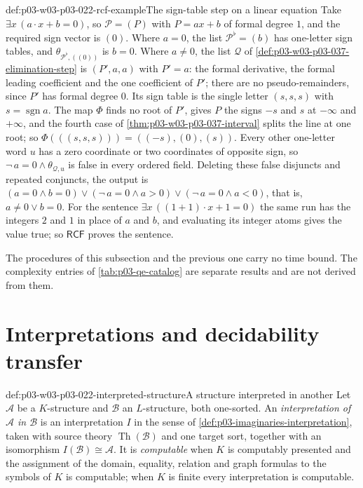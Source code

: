 \begin{hbexample}{def:p03-w03-p03-022-rcf-example}{The sign-table step on a linear equation}
Take \(\exists x\,(a\cdot x+b=0)\), so \(\mathcal P=(P)\) with
\(P=ax+b\) of formal degree \(1\), and the required sign vector is \((0)\).
Where \(a=0\), the list \(\mathcal P^\flat=(b)\) has one-letter sign tables,
and \(\theta_{\mathcal P^\flat,((0))}\) is \(b=0\). Where \(a\ne0\), the list
\(\mathcal Q\) of \cref{def:p03-w03-p03-037-elimination-step} is
\((P',a,a)\) with \(P'=a\): the formal derivative, the formal leading
coefficient and the one coefficient of \(P'\); there are no
pseudo-remainders, since \(P'\) has formal degree \(0\). Its sign table is
the single letter \((s,s,s)\) with \(s=\operatorname{sgn}a\). The map
\(\Phi\) finds no root of \(P'\), gives \(P\) the signs \(-s\) and \(s\) at
\(-\infty\) and \(+\infty\), and the fourth case of
\cref{thm:p03-w03-p03-037-interval} splits the line at one root; so
\(\Phi(((s,s,s)))=((-s),(0),(s))\). Every other one-letter word \(u\) has a
zero coordinate or two coordinates of opposite sign, so
\(\neg\,a=0\land\theta_{\mathcal Q,u}\) is false in every ordered field.
Deleting these false disjuncts and repeated conjuncts, the output is
\((a=0\land b=0)\lor(\neg\,a=0\land a>0)\lor(\neg\,a=0\land a<0)\), that
is, \(a\ne0\lor b=0\). For the sentence \(\exists x\,((1+1)\cdot x+1=0)\)
the same run has the integers \(2\) and \(1\) in place of \(a\) and \(b\),
and evaluating its integer atoms gives the value true; so \(\mathsf{RCF}\)
proves the sentence.
\end{hbexample}

The procedures of this subsection and the previous one carry no time bound.
The complexity entries of \cref{tab:p03-qe-catalog} are separate results
and are not derived from them.

\section{Interpretations and decidability transfer}
\label{sec:p03-w03-p03-022-interpretations}

\begin{hbdefinition}{def:p03-w03-p03-022-interpreted-structure}{A structure interpreted in another}
Let \(\mathcal A\) be a \(K\)-structure and \(\mathcal B\) an \(L\)-structure,
both one-sorted. An \emph{interpretation of \(\mathcal A\) in \(\mathcal B\)}
is an interpretation \(I\) in the sense of
\cref{def:p03-imaginaries-interpretation}, taken with source theory
\(\operatorname{Th}(\mathcal B)\) and one target sort, together with an isomorphism
\(I(\mathcal B)\cong\mathcal A\). It is \emph{computable} when \(K\) is
computably presented and the assignment of the domain, equality, relation
and graph formulas to the symbols of \(K\) is computable; when \(K\) is
finite every interpretation is computable.
\end{hbdefinition}

